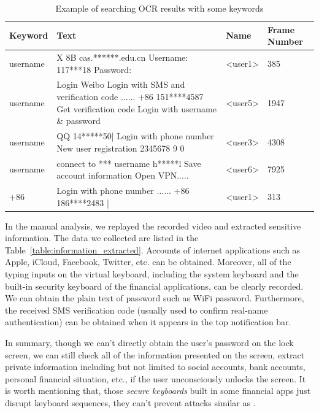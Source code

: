 \begin{table}[t]
	\centering
	\begin{tabular}{|l|l|l|l|}
		\hline
		Keyword  & Text                                                                                                                          & Name                           & Frame Number \\ \hline
		username & X 8B cas.******.edu.cn Username: 117***18 Password:                                                                           & \textless{}user1\textgreater{} & 385          \\ \hline
		username & Login Weibo Login with SMS and verification code ...... +86 151****4587 Get verification code Login with username \& password & \textless{}user5\textgreater{} & 1947         \\ \hline
		username & QQ 14*****50| Login with phone number New user registration 2345678 9 0                                                       & \textless{}user3\textgreater{} & 4308         \\ \hline
		username & connect to *** username h*****l Save account information Open VPN.....                                                        & \textless{}user6\textgreater{} & 7925         \\ \hline
		+86      & Login with phone number ...... +86 186****2483 |                                                                              & \textless{}user1\textgreater{} & 313          \\ \hline
	\end{tabular}
	\caption{Example of searching OCR results with some keywords}
	\label{tab:ocr_keyword_example}
\end{table}


In the manual analysis, we replayed the recorded video and extracted sensitive information.
The data we collected are listed in the Table~\ref{table:information_extracted}.
Accounts of internet applications such as Apple, iCloud, Facebook, Twitter, etc. can be obtained.
Moreover, all of the typing inputs on the virtual keyboard, including the system keyboard and the built-in security keyboard of the financial applications, can be clearly recorded.
We can obtain the plain text of password such as WiFi password.
Furthermore, the received SMS verification code (usually used to confirm real-name authentication) can be obtained when it appears in the top notification bar.

In summary, though we can't directly obtain the user's password on the lock screen, we can still check all of the information presented on the screen, extract private information including but not limited to social accounts, bank accounts, personal financial situation, etc., if the user unconsciously unlocks the screen.
It is worth mentioning that, those \textit{secure keyboards} built in some financial apps just disrupt keyboard sequences, they can't prevent attacks similar as \tool.

